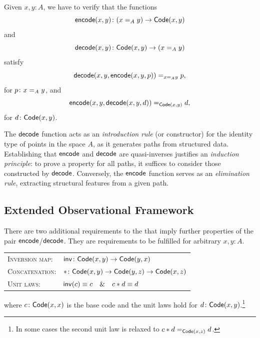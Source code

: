 \begin{rem}\label{rem:framework-qinv}
    Given $x,y\colon A$, we have to verify that the functions
    \[
        \fun{encode}(x,y)\colon(x\eq Ay)\to\fun{Code}(x,y)
    \]
    and
    \[
        \fun{decode}(x,y)\colon\fun{Code}(x,y)\to(x\eq Ay)
    \]
    satisfy
        \[
            \mathsf{decode}(x,y,\mathsf{encode}(x,y,p))\mathrel{=_{x\mathrel{=_{A}}y}}p,
        \]
        for $p\colon x\eq Ay$, and
        \[
            \mathsf{encode}(x,y,\mathsf{decode}(x,y,d))\mathrel{=_{\mathsf{Code}(x,y)}}d,
        \]
    for $d\colon\fun{Code}(x,y)$.
\end{rem}

\begin{rem}
    The $\mathsf{decode}$ function acts as an \textit{introduction rule} (or constructor) for the identity type of points in the space $A$, as it generates paths from structured data. Establishing that $\mathsf{encode}$ and $\mathsf{decode}$ are quasi-inverses justifies an \textit{induction principle}: to prove a property for all paths, it suffices to consider those constructed by $\mathsf{decode}$. Conversely, the $\mathsf{encode}$ function serves as an \textit{elimination rule}, extracting structural features from a given path.
\end{rem}

\subsection{Extended Observational Framework}\label{extended-framework}

There are two additional requirements to the  that imply further properties of the pair $\mathsf{encode}$/$\mathsf{decode}$. They are requirements to be fulfilled for arbitrary $x,y\colon A$.

\begin{center}
    \begin{tabular}{ll}
        \textsc{Inversion map:}
            &$\fun{inv}\colon\fun{Code}(x,y)\to\fun{Code}(y,x)$\\
            [1.5ex]
        \textsc{Concatenation:}
            &$\ect\colon\fun{Code}(x,y)\to\fun{Code}
            (y,z)\to\fun{Code}(x,z)$\\
            [1.5ex]
        \textsc{Unit laws:}
            &$\mathsf{inv}(c)\equiv c
            \quad\text{\&}\quad
            c\mathbin\ast d\equiv d$
    \end{tabular}    
\end{center}
where $c\colon\fun{Code}(x,x)$ is the base code and the unit laws hold for $d\colon\fun{Code}(x,y)$.\footnote{In some cases the second unit law is relaxed to $c\mathbin\ast d\mathrel{=_{\mathsf{Code}(x,z)}}d$.}


